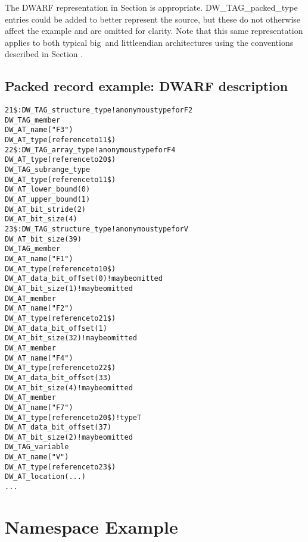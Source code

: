The DWARF representation in 
Section  
is
appropriate. 
DW\_TAG\_packed\_type entries could be added to
better represent the source, but these do not otherwise affect
the example and are omitted for clarity. Note that this same
representation applies to both typical big\dash \ and 
little\dash endian
architectures using the conventions described in 
Section .


\subsection{Packed record example: DWARF description}
\label{app:packedrecordexampledwarfdescription}
\begin{alltt}

21\$: DW\_TAG\_structure\_type ! anonymous type for F2
        DW\_TAG\_member
            DW\_AT\_name("F3")
            DW\_AT\_type(reference to 11\$)
22\$: DW\_TAG\_array\_type ! anonymous type for F4
        DW\_AT\_type(reference to 20\$)
        DW\_TAG\_subrange\_type
            DW\_AT\_type(reference to 11\$)
            DW\_AT\_lower\_bound(0)
            DW\_AT\_upper\_bound(1)
        DW\_AT\_bit\_stride(2)
        DW\_AT\_bit\_size(4)
23\$: DW\_TAG\_structure\_type ! anonymous type for V
        DW\_AT\_bit\_size(39)
        DW\_TAG\_member
            DW\_AT\_name("F1")
            DW\_AT\_type(reference to 10\$)
            DW\_AT\_data\_bit\_offset(0)! may be omitted
            DW\_AT\_bit\_size(1) ! may be omitted
        DW\_AT\_member
            DW\_AT\_name("F2")
            DW\_AT\_type(reference to 21\$)
            DW\_AT\_data\_bit\_offset(1)
            DW\_AT\_bit\_size(32) ! may be omitted
        DW\_AT\_member
            DW\_AT\_name("F4")
            DW\_AT\_type(reference to 22\$)
            DW\_AT\_data\_bit\_offset(33)
            DW\_AT\_bit\_size(4) ! may be omitted
        DW\_AT\_member
            DW\_AT\_name("F7")
            DW\_AT\_type(reference to 20\$) ! type T
            DW\_AT\_data\_bit\_offset(37)
            DW\_AT\_bit\_size(2) ! may be omitted
     DW\_TAG\_variable
        DW\_AT\_name("V")
        DW\_AT\_type(reference to 23\$)
        DW\_AT\_location(...)
        ...
\end{alltt}

\section{Namespace Example}
\label{app:namespaceexample}


